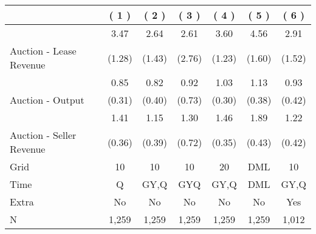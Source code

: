 
\begin{tabular}{lcccccc}
\toprule
  & ( 1 ) & ( 2 ) & ( 3 ) & ( 4 ) & ( 5 ) & ( 6 )\\
\midrule
 & 3.47 & 2.64 & 2.61 & 3.60 & 4.56 & 2.91\\

\multirow{-2}{*}{\raggedright\arraybackslash Auction - Lease Revenue} & (1.28) & (1.43) & (2.76) & (1.23) & (1.60) & (1.52)\\

\midrule
 & 0.85 & 0.82 & 0.92 & 1.03 & 1.13 & 0.93\\

\multirow{-2}{*}{\raggedright\arraybackslash Auction - Output} & (0.31) & (0.40) & (0.73) & (0.30) & (0.38) & (0.42)\\

\midrule
 & 1.41 & 1.15 & 1.30 & 1.46 & 1.89 & 1.22\\

\multirow{-2}{*}{\raggedright\arraybackslash Auction - Seller Revenue} & (0.36) & (0.39) & (0.72) & (0.35) & (0.43) & (0.42)\\

\midrule
Grid & 10 & 10 & 10 & 20 & DML & 10\\

Time & Q & GY,Q & GYQ & GY,Q & DML & GY,Q\\

Extra & No & No & No & No & No & Yes\\

N & 1,259 & 1,259 & 1,259 & 1,259 & 1,259 & 1,012\\
\bottomrule
\end{tabular}
